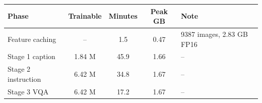 \begin{tabular}{lcccl}\toprule Phase & Trainable & Minutes & Peak GB & Note \\ \midrule
Feature caching & -- & 1.5 & 0.47 & 9387 images, 2.83 GB FP16 \\
Stage 1 caption & 1.84 M & 45.9 & 1.66 & -- \\
Stage 2 instruction & 6.42 M & 34.8 & 1.67 & -- \\
Stage 3 VQA & 6.42 M & 17.2 & 1.67 & -- \\
\bottomrule\end{tabular}
